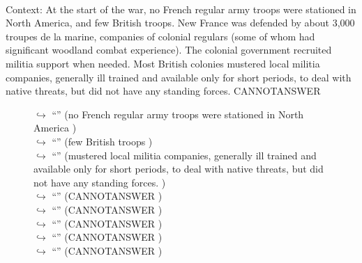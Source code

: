 \documentclass[11pt,a4paper, onecolumn]{article}
\begin{document}
\\ Context: At the start of the war, no French regular army troops were stationed in North America, and few British troops. New France was defended by about 3,000 troupes de la marine, companies of colonial regulars (some of whom had significant woodland combat experience). The colonial government recruited militia support when needed. Most British colonies mustered local militia companies, generally ill trained and available only for short periods, to deal with native threats, but did not have any standing forces. CANNOTANSWER

\begin{figure}[t] \small \begin{tcolorbox}[boxsep=0pt,left=5pt,right=0pt,top=2pt,colback = yellow!5] \begin{dialogue}
 \small 
\colorbox{pink!25}{$\hookrightarrow$}
{ ``'' (no French regular army troops were stationed in North America ) }
\\
\colorbox{pink!25}{$\hookrightarrow$}
{ ``'' (few British troops ) }
\\
\colorbox{pink!25}{$\hookrightarrow$}
{ ``'' (mustered local militia companies, generally ill trained and available only for short periods, to deal with native threats, but did not have any standing forces. ) }
\\
\colorbox{pink!25}{$\hookrightarrow$}
{ ``'' (CANNOTANSWER ) }
\\
\colorbox{pink!25}{$\hookrightarrow$}
{ ``'' (CANNOTANSWER ) }
\\
\colorbox{pink!25}{$\hookrightarrow$}
{ ``'' (CANNOTANSWER ) }
\\
\colorbox{pink!25}{$\hookrightarrow$}
{ ``'' (CANNOTANSWER ) }
\\
\colorbox{pink!25}{$\hookrightarrow$}
{ ``'' (CANNOTANSWER ) }
\\
 \end{dialogue}\end{tcolorbox}\end{figure}
\end{document}
